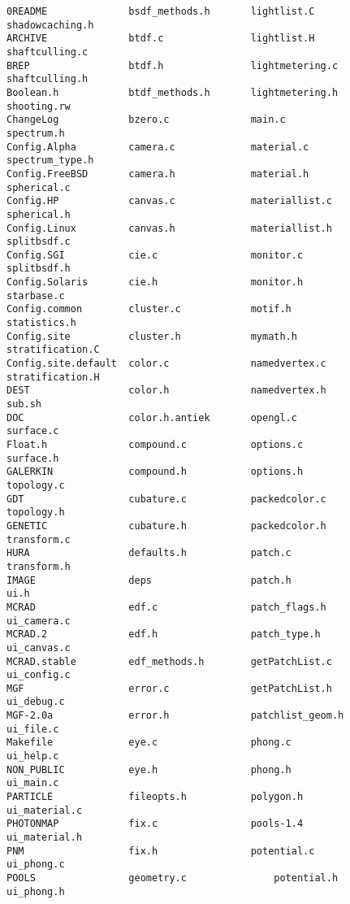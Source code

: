 \documentclass[11pt]{report}
\begin{document}
\begin{figure}
\begin{small}
\begin{verbatim}
0README              bsdf_methods.h       lightlist.C          shadowcaching.h
ARCHIVE              btdf.c               lightlist.H          shaftculling.c
BREP                 btdf.h               lightmetering.c      shaftculling.h
Boolean.h            btdf_methods.h       lightmetering.h      shooting.rw
ChangeLog            bzero.c              main.c               spectrum.h
Config.Alpha         camera.c             material.c           spectrum_type.h
Config.FreeBSD       camera.h             material.h           spherical.c
Config.HP            canvas.c             materiallist.c       spherical.h
Config.Linux         canvas.h             materiallist.h       splitbsdf.c
Config.SGI           cie.c                monitor.c            splitbsdf.h
Config.Solaris       cie.h                monitor.h            starbase.c
Config.common        cluster.c            motif.h              statistics.h
Config.site          cluster.h            mymath.h             stratification.C
Config.site.default  color.c              namedvertex.c        stratification.H
DEST                 color.h              namedvertex.h        sub.sh
DOC                  color.h.antiek       opengl.c             surface.c
Float.h              compound.c           options.c            surface.h
GALERKIN             compound.h           options.h            topology.c
GDT                  cubature.c           packedcolor.c        topology.h
GENETIC              cubature.h           packedcolor.h        transform.c
HURA                 defaults.h           patch.c              transform.h
IMAGE                deps                 patch.h              ui.h
MCRAD                edf.c                patch_flags.h        ui_camera.c
MCRAD.2              edf.h                patch_type.h         ui_canvas.c
MCRAD.stable         edf_methods.h        getPatchList.c          ui_config.c
MGF                  error.c              getPatchList.h          ui_debug.c
MGF-2.0a             error.h              patchlist_geom.h     ui_file.c
Makefile             eye.c                phong.c              ui_help.c
NON_PUBLIC           eye.h                phong.h              ui_main.c
PARTICLE             fileopts.h           polygon.h            ui_material.c
PHOTONMAP            fix.c                pools-1.4            ui_material.h
PNM                  fix.h                potential.c          ui_phong.c
POOLS                geometry.c               potential.h          ui_phong.h

\end{verbatim}
\end{small}
\end{figure}
\end{document}
